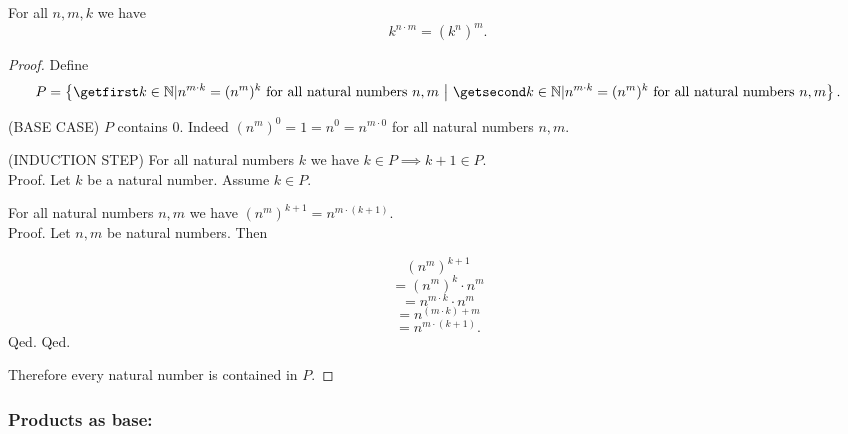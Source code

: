 \documentclass[../../arithmetic.tex]{subfiles}
\begin{document}
  \begin{forthel}
    \begin{proposition}\label{Arithmetic_01_04_531499}
      For all $n,m,k$ we have \[ k^{n \cdot m} = (k^{n})^{m}. \]
    \end{proposition}
    \begin{proof}
      Define \[ P = \class{k \in \Nat | \text{$n^{m \cdot k} = (n^{m})^{k}$ for all natural numbers $n,m$}}. \]

      (BASE CASE) $P$ contains $0$.
      Indeed $(n^{m})^{0} = 1 = n^{0} = n^{m \cdot 0}$ for all natural numbers $n,m$.

      (INDUCTION STEP) For all natural numbers $k$ we have $k \in P \implies k + 1 \in P$. \\
      Proof.
        Let $k$ be a natural number.
        Assume $k \in P$.

        For all natural numbers $n,m$ we have $(n^{m})^{k + 1} =
        n^{m \cdot (k + 1)}$. \\
        Proof.
          Let $n,m$ be natural numbers.
          Then

          \[   (n^{m})^{k + 1} \]
          \[ = (n^{m})^{k} \cdot n^{m} \]   %
          \[ = n^{m \cdot k} \cdot n^{m} \] %
          \[ = n^{(m \cdot k) + m} \]       %
          \[ = n^{m \cdot (k + 1)}. \]      %
        Qed.
      Qed.

      Therefore every natural number is contained in $P$.
    \end{proof}
  \end{forthel}


  \subsubsection*{Products as base:}
\end{document}
